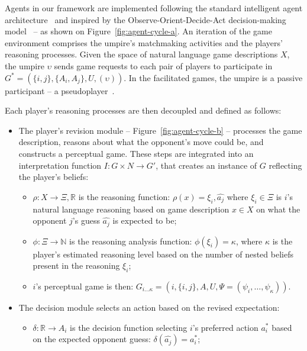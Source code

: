 \documentclass[runningheads]{llncs}
\begin{document}
Agents in our framework are implemented following the standard intelligent agent architecture~\cite{russell1995intelligent} and inspired by the Observe-Orient-Decide-Act decision-making model~\cite{bryant2006rethinking,OODA_agents} -- as shown on Figure~\ref{fig:agent-cycle-a}. An iteration of the game environment comprises the umpire's matchmaking activities and the players' reasoning processes. Given the space of natural language game descriptions $X$, the umpire $\upsilon$ sends game requests to each pair of players to participate in $G^*=(\{i,j\},\{A_i,A_j\},U,(\upsilon))$. In the facilitated games, the umpire is a passive participant -- a pseudoplayer~\cite{Rasmusen2006introtogametheory}.

Each player's reasoning processes are then decoupled and defined as follows:
\begin{itemize}
    \item The player's revision module -- Figure~\ref{fig:agent-cycle-b} -- processes the game description, reasons about what the opponent's move could be, and constructs a perceptual game. These steps are integrated into an interpretation function $I:G \times N \rightarrow G'$, that creates an instance of $G$ reflecting the player's beliefs:
    \begin{itemize}
        \item $\rho: X \rightarrow \Xi, \mathbb{R}$ is the reasoning function: $\rho(x)=\xi_i,\hat{a_{j}}$ where $\xi_i \in \Xi$ is $i$'s natural language reasoning based on game description $x \in X$ on what the opponent $j$'s guess $\hat{a_{j}}$ is expected to be;
        \item $\phi: \Xi \rightarrow \mathbb{N}$ is the reasoning analysis function: $\phi(\xi_i) = \kappa$, where $\kappa$ is the player's estimated reasoning level based on the number of nested beliefs present in the reasoning $\xi_i$;
        \item $i$'s perceptual game is then: $G_{i\ldots \kappa}=(i,\{i,j\},A,U,\Psi=(\psi_i,\ldots,\psi_\kappa))$.
    \end{itemize}
    \item The decision module selects an action based on the revised expectation:
    \begin{itemize}
        \item $\delta: \mathbb{R} \rightarrow A_i$ is the decision function selecting $i$'s preferred action $a^*_i$ based on the expected opponent guess: $\delta(\hat{a_j}) = a^*_i$;
    \end{itemize}
\end{itemize}
\end{document}
